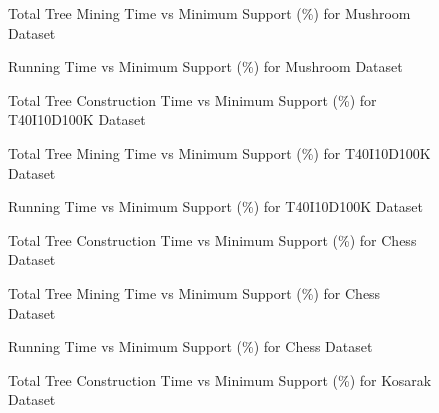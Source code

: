 			\begin{figure}[h]
			\centering
				
			\caption{Total Tree Mining Time vs Minimum Support (\%) for Mushroom Dataset }
			\label{result:g_m_mining_total}
			\end{figure}
			\begin{figure}[h]
			\centering
				
			\caption{Running Time vs Minimum Support (\%) for Mushroom Dataset }
			\label{result:g_m_total}
			\end{figure}
			\begin{figure}[h]
			\centering
				
			\caption{Total Tree Construction Time vs Minimum Support (\%) for T40I10D100K Dataset }
			\label{result:g_t10_tree_construction_total}
			\end{figure}
			
			\begin{figure}[h]
			\centering
				
			\caption{Total Tree Mining Time vs Minimum Support (\%) for T40I10D100K Dataset }
			\label{result:g_t10_mining_total}
			\end{figure}
			
			\begin{figure}[h]
			\centering
				
			\caption{Running Time vs Minimum Support (\%) for T40I10D100K Dataset }
			\label{result:g_t10_total}
			\end{figure}
	
			\begin{figure}[h]
			\centering
				
			\caption{Total Tree Construction Time vs Minimum Support (\%) for Chess Dataset }
			\label{result:g_chess_tree_construction_total}
			\end{figure}
			
			\begin{figure}[h]
			\centering
				
			\caption{Total Tree Mining Time vs Minimum Support (\%) for Chess Dataset }
			\label{result:g_chess_mining_total}
			\end{figure}
			
			\begin{figure}[h]
			\centering
				
			\caption{Running Time vs Minimum Support (\%) for Chess Dataset }
			\label{result:g_chess_total}
			\end{figure}
			\begin{figure}[h]
			\centering
				
			\caption{Total Tree Construction Time vs Minimum Support (\%) for Kosarak Dataset }
			\label{result:g_k_tree_construction_total}
			\end{figure}
			

